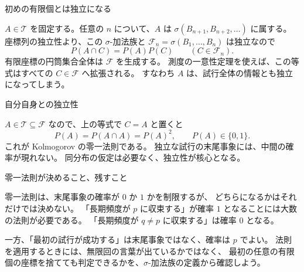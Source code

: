 \documentclass[a4paper,10pt,pdflatex,ja=standard,jafont=ipaex-type1,
  magstyle=real,scale=1]{bxjsarticle}
\newcommand{\columnheading}[1]{\par\vspace{5pt}
  {\fontsize{11pt}{15pt}\selectfont\sffamily\mdseries\color{accent}#1}\par\vspace{2pt}}
\newcommand{\F}{\mathcal F}
\begin{document}
\columnheading{初めの有限個とは独立になる}
$A\in\mathcal T$ を固定する。任意の $n$ について、$A$ は
$\sigma(B_{n+1},B_{n+2},\ldots)$ に属する。
座標列の独立性より、この $\sigma$-加法族と $\F_n=\sigma(B_1,\ldots,B_n)$ は独立なので
$$P(A\cap C)=P(A)P(C)\qquad(C\in\F_n).$$
有限座標の円筒集合全体は $\F$ を生成する。
測度の一意性定理を使えば、この等式はすべての $C\in\F$ へ拡張される。
すなわち $A$ は、試行全体の情報とも独立になってしまう。

\columnheading{自分自身との独立性}
$A\in\mathcal T\subseteq\F$ なので、上の等式で $C=A$ と置くと
$$P(A)=P(A\cap A)=P(A)^2,\qquad P(A)\in\{0,1\}.$$
これが Kolmogorov の零一法則である。
独立な試行の末尾事象には、中間の確率が現れない。
同分布の仮定は必要なく、独立性が核心となる。

\columnheading{零一法則が決めること、残すこと}
零一法則は、末尾事象の確率が $0$ か $1$ かを制限するが、
どちらになるかはそれだけでは決めない。
「長期頻度が $p$ に収束する」が確率 $1$ となることには大数の法則が必要である。
「長期頻度が $q\ne p$ に収束する」は確率 $0$ となる。

一方、「最初の試行が成功する」は末尾事象ではなく、確率は $p$ でよい。
法則を適用するときには、無限回の言葉が出ているかではなく、
最初の任意の有限個の座標を捨てても判定できるかを、$\sigma$-加法族の定義から確認しよう。

\label{lastpage}
\end{document}
